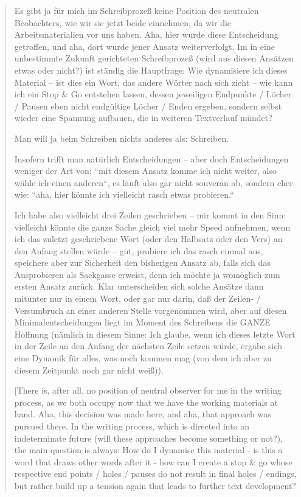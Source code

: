 \documentclass{article}
\begin{document}
\begin{quote}
Es gibt ja für mich im Schreibprozeß keine Position des neutralen
Beobachters, wie wir sie jetzt beide einnehmen, da wir die
Arbeitsmaterialien vor uns haben. Aha, hier wurde diese Entscheidung
getroffen, und aha, dort wurde jener Ansatz weiterverfolgt. Im in eine
unbestimmte Zukunft gerichteten Schreibprozeß (wird aus diesen Ansätzen
etwas oder nicht?) ist ständig die Hauptfrage: Wie dynamisiere ich
dieses Material -- ist dies ein Wort, das andere Wörter nach sich zieht
-- wie kann ich ein Stop \& Go entstehen lassen, dessen jeweiligen
Endpunkte / Löcher / Pausen eben nicht endgültige Löcher / Enden
ergeben, sondern selbst wieder eine Spannung aufbauen, die in weiteren
Textverlauf mündet?

Man will ja beim Schreiben nichts anderes als: Schreiben.

Insofern trifft man natürlich Entscheidungen -- aber doch Entscheidungen
weniger der Art von: ``mit diesem Ansatz komme ich nicht weiter, also
wähle ich einen anderen``, es läuft also gar nicht souverän ab, sondern
eher wie: ``aha, hier könnte ich vielleicht rasch etwas probieren.``

Ich habe also vielleicht drei Zeilen geschrieben -- mir kommt in den
Sinn: vielleicht könnte die ganze Sache gleich viel mehr Speed
aufnehmen, wenn ich das zuletzt geschriebene Wort (oder den Halbsatz
oder den Vers) an den Anfang stellen würde -- gut, probiere ich das
rasch einmal aus, speichere aber zur Sicherheit den bisherigen Ansatz
ab, falls sich das Ausprobieren als Sackgasse erweist, denn ich möchte
ja womöglich zum ersten Ansatz zurück. Klar unterscheiden sich solche
Ansätze dann mitunter nur in einem Wort, oder gar nur darin, daß der
Zeilen- / Versumbruch an einer anderen Stelle vorgenommen wird, aber auf
diesen Minimalentscheidungen liegt im Moment des Schreibens die GANZE
Hoffnung (nämlich in diesem Sinne: Ich glaube, wenn ich dieses letzte
Wort in der Zeile an den Anfang der nächsten Zeile setzen würde, ergäbe
sich eine Dynamik für alles, was noch kommen mag (von dem ich aber zu
diesem Zeitpunkt noch gar nicht weiß)). 

\vspace{1em}

[There is, after all, no position of neutral observer for me in the
writing process, as we both occupy now that we have the working
materials at hand. Aha, this decision was made here, and aha, that
approach was pursued there. In the writing process, which is directed
into an indeterminate future (will these approaches become something or
not?), the main question is always: How do I dynamise this material - is
this a word that draws other words after it - how can I create a stop \&
go whose respective end points / holes / pauses do not result in final
holes / endings, but rather build up a tension again that leads to
further text development?


\end{quote}
\end{document}
